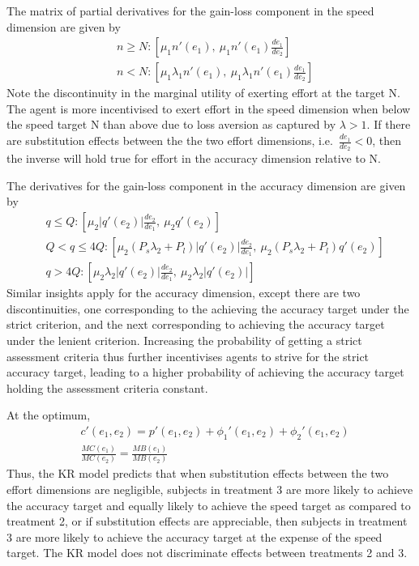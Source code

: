 \documentclass[12pt, letterpaper]{article}
\begin{document}
The matrix of partial derivatives for the gain-loss component in the speed dimension are given by
\[
\begin{aligned}
& n \geq N: [\mu_1 n'(e_1), \: \mu_1 n'(e_1) \frac {de_1}{de_2}] \\
& n < N: [\mu_1 \lambda_1 n'(e_1), \: \mu_1 \lambda_1 n'(e_1) \frac {de_1}{de_2}]
\end{aligned}
\]
Note the discontinuity in the marginal utility of exerting effort at the target N. The agent is more incentivised to exert effort in the speed dimension when below the speed target N than above due to loss aversion as captured by $\lambda>1$. If there are substitution effects between the the two effort dimensions, i.e.~$\frac {de_1}{de_2}<0$, then the inverse will hold true for effort in the accuracy dimension relative to N.

The derivatives for the gain-loss component in the accuracy dimension are given by
\[
\begin{aligned}
& q \leq Q: [\mu_2 |q'(e_2)| \frac {de_2}{de_1}, \: \mu_2 q'(e_2)] \\
& Q < q \leq 4Q: [\mu_2 (P_s \lambda_2 + P_l) |q'(e_2)| \frac {de_2}{de_1}, \: \mu_2 (P_s \lambda_2 + P_l) q'(e_2)] \\
& q > 4Q: [\mu_2 \lambda_2 |q'(e_2)| \frac {de_2}{de_1}, \: \mu_2 \lambda_2 |q'(e_2)|]
\end{aligned}
\]
Similar insights apply for the accuracy dimension, except there are two discontinuities, one corresponding to the achieving the accuracy target under the strict criterion, and the next corresponding to achieving the accuracy target under the lenient criterion. Increasing the probability of getting a strict assessment criteria thus further incentivises agents to strive for the strict accuracy target, leading to a higher probability of achieving the accuracy target holding the assessment criteria constant.

At the optimum,
\[
\begin{aligned}
& c'(e_1, e_2) = p'(e_1, e_2) + \phi_1'(e_1, e_2) + \phi_2'(e_1, e_2) \\
& \frac {MC(e_1)}{MC(e_2)} = \frac {MB(e_1)}{MB(e_2)}
\end{aligned}
\]
Thus, the KR model predicts that when substitution effects between the two effort dimensions are negligible, subjects in treatment 3 are more likely to achieve the accuracy target and equally likely to achieve the speed target as compared to treatment 2, or if substitution effects are appreciable, then subjects in treatment 3 are more likely to achieve the accuracy target at the expense of the speed target. The KR model does not discriminate effects between treatments 2 and 3.
\end{document}
